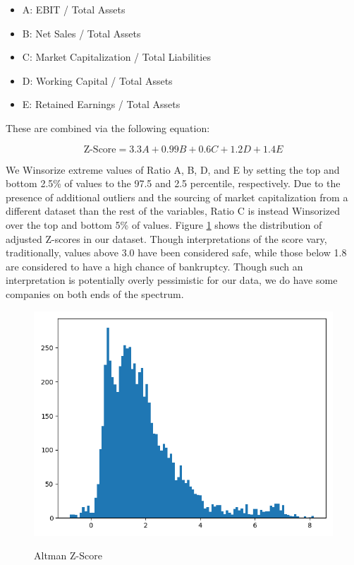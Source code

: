 \documentclass{article}[11pt]
\begin{document}
    \begin{itemize}
        \item A: EBIT / Total Assets
        \item B: Net Sales / Total Assets
        \item C: Market Capitalization / Total Liabilities
        \item D: Working Capital / Total Assets
        \item E: Retained Earnings / Total Assets
    \end{itemize}

    These are combined via the following equation:

    \begin{equation*}
        \text{Z-Score} = 3.3 A + 0.99 B + 0.6 C + 1.2 D + 1.4 E
    \end{equation*}

    We Winsorize extreme values of Ratio A, B, D, and E by setting the top and bottom 2.5\% of values to the 97.5 and 2.5 percentile, respectively. Due to the presence of additional outliers and the sourcing of market capitalization from a different dataset than the rest of the variables, Ratio C is instead Winsorized over the top and bottom 5\% of values. Figure \ref{fig:altman-z-score} shows the distribution of adjusted Z-scores in our dataset. Though interpretations of the score vary, traditionally, values above 3.0 have been considered safe, while those below 1.8 are considered to have a high chance of bankruptcy. Though such an interpretation is potentially overly pessimistic for our data, we do have some companies on both ends of the spectrum.

    \begin{figure}[h!]
		\centering
        \caption{Altman Z-Score}
        \includegraphics[width=0.5\linewidth,keepaspectratio=true]{../Output/All Data EDA/Tabular EDA/altman_z_score_all_data_no_title.png}
        \label{fig:altman-z-score}
	\end{figure}    
\end{document}
